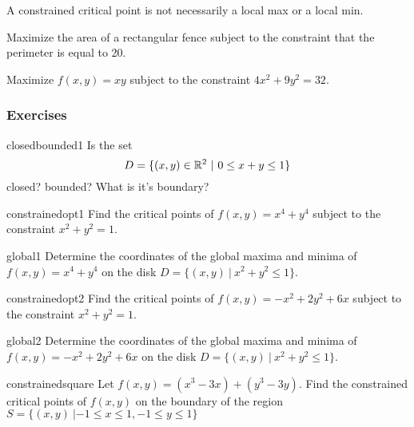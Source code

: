     \begin{remark}
    A constrained critical point is not necessarily a local max or a local min.
    \end{remark}

    \begin{example}
    Maximize the area of a rectangular fence subject to the constraint that the perimeter is equal to 20.
    \end{example}

    \begin{example}
    Maximize $f(x,y) = xy$ subject to the constraint $4x^2 + 9y^2 = 32$.    
    \end{example}











\subsubsection{Exercises}

\begin{problem}{closedbounded1}
    Is the set $$D = \{(x,y) \in \mathbb{R}^2 \ | \ 0 \leq x + y \leq 1 \}$$ closed? bounded? What is it's boundary?
\end{problem}


\begin{problem}{constrainedopt1}
    Find the critical points of $f(x,y) = x^4 + y^4$ subject to the constraint $x^2+y^2=1$.  
\end{problem}

\begin{problem}{global1}
    Determine the coordinates of the global maxima and minima of $f(x,y) = x^4 + y^4$ on the disk $D = \{ (x,y) \ | \ x^2 + y^2 \leq 1\}$.
\end{problem}

\begin{problem}{constrainedopt2}
    Find the critical points of $f(x,y) = -x^2+2y^2+6x$ subject to the constraint $x^2+y^2=1$.  
\end{problem}

\begin{problem}{global2}
    Determine the coordinates of the global maxima and minima of $f(x,y) = -x^2+2y^2+6x$ on the disk $D = \{ (x,y) \ | \ x^2 + y^2 \leq 1\}$.
\end{problem}

\begin{problem}{constrainedsquare}
    Let $f(x,y) = (x^3 - 3x) + (y^3-3y)$.  Find the constrained critical points of $f(x,y)$ on the boundary of the region $S = \{(x,y) \ | -1 \leq x \leq 1, -1 \leq y \leq 1\}$
\end{problem}

